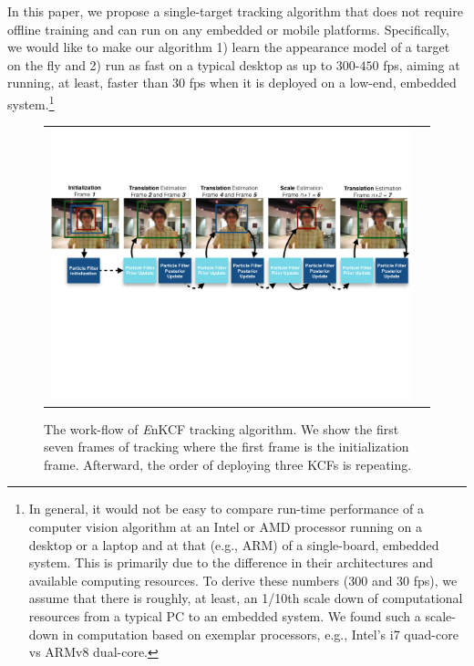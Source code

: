\documentclass[10pt,twocolumn,letterpaper]{article}
\begin{document}
In this paper, we propose a single-target tracking algorithm that does
not require offline training and can run on any embedded or mobile
platforms. Specifically, we would like to make our algorithm 1) learn
the appearance model of a target on the fly and 2) run as fast on a
typical desktop as up to $300$-$450$ fps, aiming at running, at least,
faster than 30 fps when it is deployed on a low-end, embedded
system.\footnote{In general, it would not be easy to compare run-time
  performance of a computer vision algorithm at an Intel or AMD
  processor running on a desktop or a laptop and at that (e.g., ARM)
  of a single-board, embedded system. This is primarily due to the
  difference in their architectures and available computing
  resources. To derive these numbers (300 and 30 fps), we assume that
  there is roughly, at least, an 1/10th scale down of computational
  resources from a typical PC to an embedded system. We found such a
  scale-down in computation based on exemplar processors, e.g.,
  Intel's i7 quad-core vs ARMv8 dual-core.}

\begin{figure}[!h]
\centering
\begin{tabular}{cc}
\includegraphics[width=14.00cm]{./figures/Workflow_MKCF+PF.pdf}\\
\end{tabular}
\caption{The work-flow of {\it E}nKCF tracking algorithm. We show the
  first seven frames of tracking where the first frame is the
  initialization frame. Afterward, the order of deploying three KCFs
  is repeating.}
\label{Workflows}
\end{figure}
\end{document}
